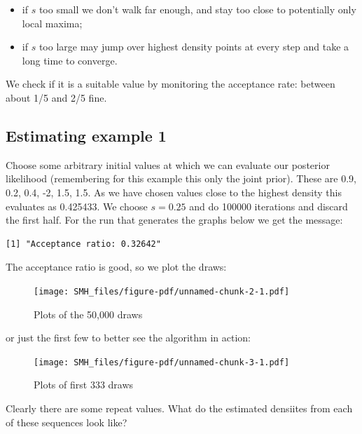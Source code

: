 \documentclass[
  letterpaper,
]{book}
\providecommand{\tightlist}{%
  \setlength{\itemsep}{0pt}\setlength{\parskip}{0pt}}\usepackage{longtable,booktabs,array}
\begin{document}
\begin{itemize}
\tightlist
\item
  if \(s\) too small we don't walk far enough, and stay too close to
  potentially only local maxima;
\item
  if \(s\) too large may jump over highest density points at every step
  and take a long time to converge.
\end{itemize}

We check if it is a suitable value by monitoring the acceptance rate:
between about 1/5 and 2/5 fine.

\hypertarget{estimating-example-1}{%
\subsection{Estimating example 1}\label{estimating-example-1}}

Choose some arbitrary initial values at which we can evaluate our
posterior likelihood (remembering for this example this only the joint
prior). These are 0.9, 0.2, 0.4, -2, 1.5, 1.5. As we have chosen values
close to the highest density this evaluates as 0.425433. We choose
\(s=0.25\) and do 100000 iterations and discard the first half. For the
run that generates the graphs below we get the message:

\begin{verbatim}
[1] "Acceptance ratio: 0.32642"
\end{verbatim}

The acceptance ratio is good, so we plot the draws:

\begin{figure}

{\centering \texttt{[image: SMH\_files/figure-pdf/unnamed-chunk-2-1.pdf]}

}

\caption{Plots of the 50,000 draws}

\end{figure}

or just the first few to better see the algorithm in action:

\begin{figure}

{\centering \texttt{[image: SMH\_files/figure-pdf/unnamed-chunk-3-1.pdf]}

}

\caption{Plots of first 333 draws}

\end{figure}

Clearly there are some repeat values. What do the estimated densiites
from each of these sequences look like?
\end{document}
